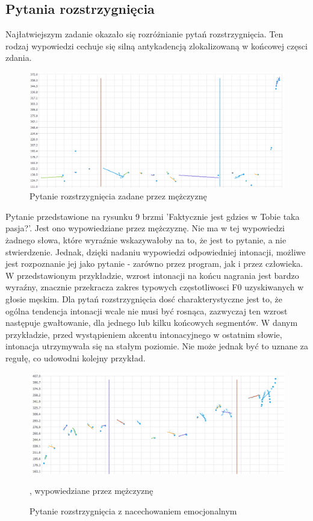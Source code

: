 \documentclass[a4paper,12 pt]{article}
\begin{document}
\subsection{Pytania rozstrzygnięcia}
Najłatwiejszym zadanie okazało się rozróżnianie pytań rozstrzygnięcia. Ten rodzaj wypowiedzi cechuje się silną antykadencją zlokalizowaną w końcowej częsci zdania.
 \FloatBarrier
\begin{figure}[h]
\centering
\includegraphics[scale=0.7]{pytanie_rozstrzygniecia.png}
\caption{Pytanie rozstrzygnięcia zadane przez mężczyznę}
\end{figure}
\FloatBarrier
Pytanie przedstawione na rysunku 9 brzmi 'Faktycznie jest gdzies w Tobie taka pasja?'. Jest ono wypowiedziane przez mężczyznę. Nie ma w tej wypowiedzi żadnego słowa, które wyraźnie wskazywałoby na to, że jest to pytanie, a nie stwierdzenie. Jednak, dzięki nadaniu wypowiedzi odpowiedniej intonacji, możliwe jest rozpoznanie jej jako pytanie - zarówno przez program, jak i przez człowieka. W przedstawionym przykładzie, wzrost intonacji na końcu nagrania jest bardzo wyraźny, znacznie przekracza zakres typowych częstotliwosci F0 uzyskiwanych w głosie męskim. Dla pytań rozstrzygnięcia dosć charakterystyczne jest to, że ogólna tendencja intonacji wcale nie musi być rosnąca, zazwyczaj ten wzrost następuje gwałtowanie, dla jednego lub kilku końcowych segmentów. W danym przykładzie, przed wystąpieniem akcentu intonacyjnego w ostatnim słowie, intonacja utrzymywała się na stałym poziomie. Nie może jednak być to uznane za regułę, co udowodni kolejny przykład.
 \FloatBarrier
\begin{figure}[h]
\centering
\includegraphics[scale=0.7]{pytanie_rozstrzygniecia_2_emocje.png}
\caption{Pytanie rozstrzygnięcia z nacechowaniem emocjonalnym}, wypowiedziane przez mężczyznę
\end{figure}
\end{document}
